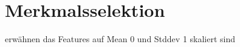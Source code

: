 \section{Merkmalsselektion}
\label{merkmalsselektion}

erwähnen das Features auf Mean 0 und Stddev 1 skaliert sind
